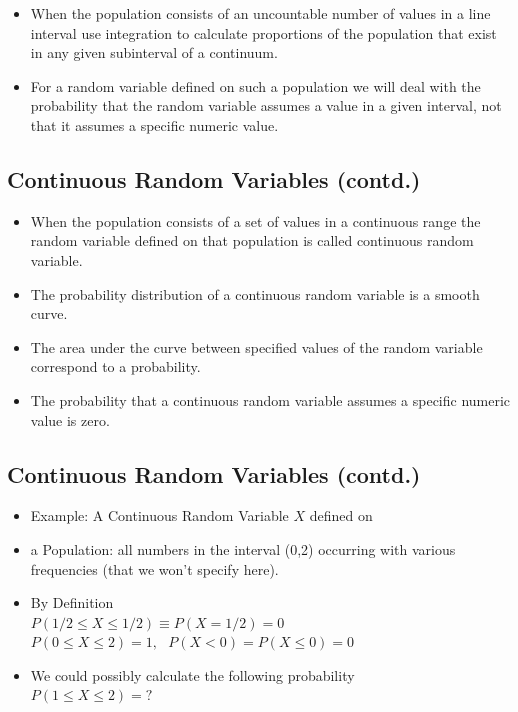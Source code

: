 \documentclass[
  letterpaper,
  DIV=11,
  numbers=noendperiod]{scrartcl}
\begin{document}
\begin{itemize}
\item
  When the population consists of an uncountable number of values in a
  line interval use integration to calculate proportions of the
  population that exist in any given {subinterval} of a continuum.
\item
  For a random variable defined on such a population we will deal with
  the probability that the random variable assumes a value in a given
  interval, not that it assumes a specific numeric value.
\end{itemize}

\subsection{Continuous Random Variables
(contd.)}\label{continuous-random-variables-contd.}

\begin{itemize}
\item
  When the population consists of a set of values in a continuous range
  the random variable defined on that population is called {continuous
  random variable}.
\item
  The probability distribution of a continuous random variable is a
  smooth curve.
\item
  The {area under the curve} between specified values of the random
  variable correspond to a probability.
\item
  The probability that a continuous random variable assumes a specific
  numeric value is zero.
\end{itemize}

\subsection{Continuous Random Variables
(contd.)}\label{continuous-random-variables-contd.-1}

\begin{itemize}
\item
  {Example:} A Continuous Random Variable \(X\) defined on
\item
  a {Population}: all numbers in the interval (0,2) occurring with
  various frequencies (that we won't specify here).
\item
  By Definition\\
  \(P(1/2 \leq X \leq 1/2) \equiv P(X = 1/2) = 0\)\\
  \(P(0 \leq X \leq 2) = 1,\ \ \ P(X < 0) = P(X \leq 0) = 0\)
\item
  We could possibly calculate the following probability\\
  \(P(1 \leq X \leq 2) = ?\)
\end{itemize}
\end{document}
